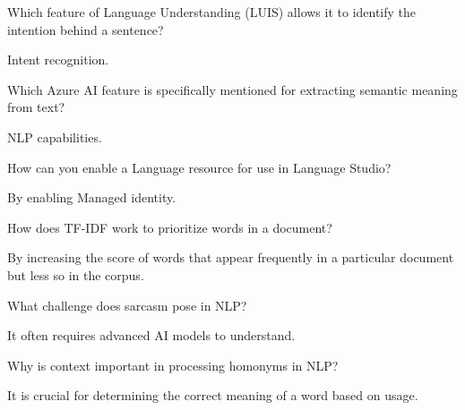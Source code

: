 \begin{qanda}
	\begin{question}
Which feature of Language Understanding (LUIS) allows it to identify the intention behind a sentence?
	\end{question}
	\begin{answer}
Intent recognition.
	\end{answer}
\end{qanda}

\begin{qanda}
	\begin{question}
Which Azure AI feature is specifically mentioned for extracting semantic meaning from text?
	\end{question}
	\begin{answer}
NLP capabilities.
	\end{answer}
\end{qanda}

\begin{qanda}
	\begin{question}
How can you enable a Language resource for use in Language Studio?
	\end{question}
	\begin{answer}
By enabling Managed identity.
	\end{answer}
\end{qanda}

\begin{qanda}
	\begin{question}
How does TF-IDF work to prioritize words in a document?
	\end{question}
	\begin{answer}
By increasing the score of words that appear frequently in a particular document but less so in the corpus.
	\end{answer}
\end{qanda}

\begin{qanda}
	\begin{question}
What challenge does sarcasm pose in NLP?
	\end{question}
	\begin{answer}
It often requires advanced AI models to understand.
	\end{answer}
\end{qanda}

\begin{qanda}
	\begin{question}
Why is context important in processing homonyms in NLP?
	\end{question}
	\begin{answer}
It is crucial for determining the correct meaning of a word based on usage.
	\end{answer}
\end{qanda}

